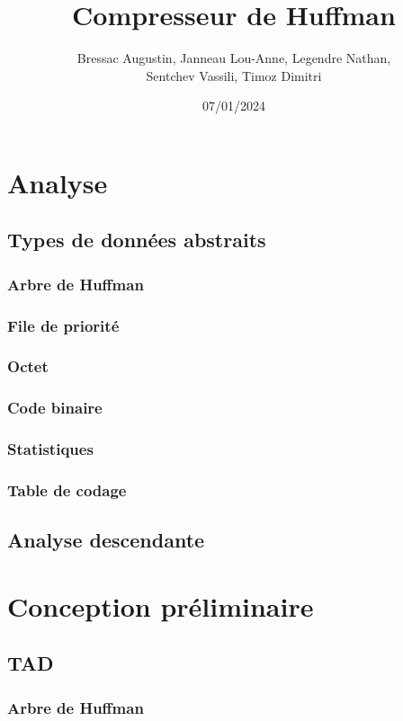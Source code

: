 \documentclass[12pt,a4paper]{article}
\title{Compresseur de Huffman}
\author{Bressac Augustin, Janneau Lou-Anne, Legendre Nathan,\\ Sentchev Vassili, Timoz Dimitri}
\date{07/01/2024}
\begin{document}
\maketitle

\newpage
\tableofcontents

\section{Analyse}
\subsection{Types de données abstraits}
\subsubsection{Arbre de Huffman}

\subsubsection{File de priorité}

\subsubsection{Octet}

\subsubsection{Code binaire}

\subsubsection{Statistiques}

\subsubsection{Table de codage}

\subsection{Analyse descendante}
%

\section{Conception préliminaire}
\subsection{TAD}
\subsubsection{Arbre de Huffman}

\end{document}
